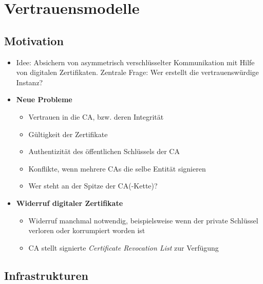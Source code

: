 \section{Vertrauensmodelle}

\subsection{Motivation}
\begin{itemize}
	\item Idee: Absichern von asymmetrisch verschlüsselter Kommunikation mit Hilfe von digitalen Zertifikaten. Zentrale Frage: Wer erstellt die vertrauenswürdige Instanz?
	\item \textbf{Neue Probleme}
	\begin{itemize}
		\item Vertrauen in die CA, bzw. deren Integrität
		\item Gültigkeit der Zertifikate
		\item Authentizität des öffentlichen Schlüssels der CA
		\item Konflikte, wenn mehrere CAs die selbe Entität signieren
		\item Wer steht an der Spitze der CA(-Kette)?
	\end{itemize}
	\item \textbf{Widerruf digitaler Zertifikate}
	\begin{itemize}
		\item Widerruf manchmal notwendig, beispielsweise wenn der private Schlüssel verloren oder korrumpiert worden ist
		\item CA stellt signierte \textit{Certificate Revocation List} zur Verfügung
	\end{itemize}
\end{itemize}


\subsection{Infrastrukturen}


